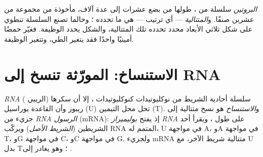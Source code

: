 \begin{definition}\label{def:g11:gene-expression:protein}
\emph{البروتين} سلسلة من ، طولها من بضع
عشرات إلى عدة آلاف، مأخوذة من مجموعة من عشرين صنفًا.
و\emph{المتتالية} --- أي ترتيب  --- هي ما تحدده
؛ وحالما تصنع السلسلة تنطوي على شكل ثلاثي الأبعاد محدد تحدده
تلك المتتالية، والشكل يحدد الوظيفة. فغيّر حمضًا أمينيًا واحدًا فقد
يتغير الطي، وتتغير الوظيفة.
\end{definition}

\section{الاستنساخ: المورّثة تنسخ إلى RNA}

\begin{definition}\label{def:g11:gene-expression:transcription}
\emph{RNA} ( الريبي) سلسلة أحادية الشريط من
نوكليوتيدات كنوكليوتيدات ، إلا أن سكرها ريبوز وأن القاعدة يوراسيل
(U) تحل محل التيمين (T). و\emph{الاستنساخ} هو نسخ
متتالية  إلى جزيء من \emph{RNA الرسول}
(mRNA): إذ يفتح  \emph{بوليميراز RNA}  على طول
، ويقرأ أحد الشريطين (\emph{الشريط الأصل}) ويركّب RNA المتمم
له، U في مواجهة A، وA في مواجهة T، وG في مواجهة C، وC في مواجهة G.
ولجزيء mRNA متتالية شريط  الآخر، مع U بدل T؛ وهو يغادر  إلى
.
\end{definition}


